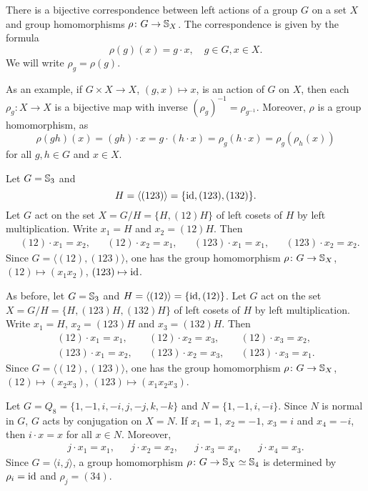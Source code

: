 There is a bijective correspondence between 
left actions of a group $G$ on a set $X$ and
group homomorphisms 
$\rho\colon G\to\mathbb{S}_X$. The correspondence is given by
the formula 
\[
\rho(g)(x)=g\cdot x,\quad g\in G,x\in X.
\]
We will write $\rho_g=\rho(g)$.

As an example, if $G\times X\to X$, $(g,x)\mapsto x$, is 
an action of $G$ on $X$, then
each $\rho_g\colon X\to X$ is a bijective map with inverse 
$(\rho_g)^{-1}=\rho_{g^{-1}}$. Moreover, 
 $\rho$ is a group homomorphism, as 
\[
\rho(gh)(x)=(gh)\cdot x=g\cdot (h\cdot x)=\rho_g(h\cdot x)=\rho_g(\rho_h(x))
\]
for all $g,h\in G$ and $x\in X$.

\begin{example}
Let $G=\mathbb{S}_3$ and 
\[
H=\langle (123)\rangle=\{\operatorname{id},(123),(132)\}.
\]
Let $G$ act on the set $X=G/H=\{H,(12)H\}$ of left cosets of $H$ 
by left multiplication. Write 
$x_1=H$ and $x_2=(12)H$. Then
\begin{align*}
&(12)\cdot x_1=x_2,
&&(12)\cdot x_2=x_1,
&&(123)\cdot x_1=x_1,
&&(123)\cdot x_2=x_2.
\end{align*}
Since $G=\langle (12),(123)\rangle$, one has the group 
homomorphism 
$\rho\colon G\to\mathbb{S}_{X}$, 
$(12)\mapsto (x_1x_2)$, $(123)\mapsto\operatorname{id}$.
\end{example}

\begin{example}
As before, let $G=\mathbb{S}_3$ and $H=\langle (12)\rangle=\{\operatorname{id},(12)\}$. Let $G$ act on the set $X=G/H=\{H,(123
)H,(132)H\}$ of left cosets of $H$ by left multiplication. Write 
$x_1=H$, $x_2=(123)H$ and $x_3=(132)H$. Then
\begin{align*}
(12)\cdot x_1=x_1,&& (12)\cdot x_2=x_3, && (12)\cdot x_3=x_2,\\
(123)\cdot x_1=x_2, && (123)\cdot x_2=x_3, &&(123)\cdot x_3=x_1.
\end{align*}
Since $G=\langle (12),(123)\rangle$, one has the group
homomorphism 
$\rho\colon G\to\mathbb{S}_{X}$, $(12)\mapsto (x_2x_3)$, $(123)\mapsto (x_1x_2x_3)$.
\end{example}


\begin{example}
Let $G=Q_8=\{1,-1,i,-i,j,-j,k,-k\}$ and $N=\{1,-1,i,-i\}$. Since
$N$ is normal in $G$, $G$
acts by conjugation on $X=N$.
If $x_1=1$, $x_2=-1$, $x_3=i$ and $x_4=-i$, then
$i\cdot x=x$ for all $x\in N$. Moreover, 
\begin{align*}
j\cdot x_1=x_1, && j\cdot x_2=x_2, && j\cdot x_3=x_4, && j\cdot x_4=x_3.
\end{align*}
Since $G=\langle i,j\rangle$, a group homomorphism $\rho\colon G\to\mathbb{S}_X\simeq\mathbb{S}_4$ is determined by 
$\rho_i=\operatorname{id}$ and $\rho_j=(34)$.
\end{example}



